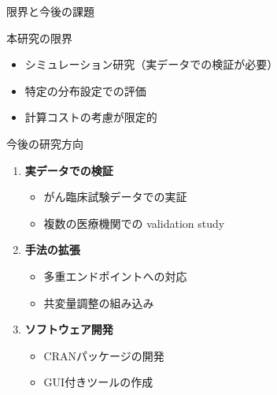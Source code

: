 \documentclass[11pt,aspectratio=169]{beamer}
\begin{document}
\begin{frame}{限界と今後の課題}
\begin{block}{本研究の限界}
\begin{itemize}
\item シミュレーション研究（実データでの検証が必要）
\item 特定の分布設定での評価
\item 計算コストの考慮が限定的
\end{itemize}
\end{block}

\vspace{1em}

\begin{block}{今後の研究方向}
\begin{enumerate}
\item \textbf{実データでの検証}
\begin{itemize}
\item がん臨床試験データでの実証
\item 複数の医療機関での validation study
\end{itemize}

\item \textbf{手法の拡張}
\begin{itemize}
\item 多重エンドポイントへの対応
\item 共変量調整の組み込み
\end{itemize}

\item \textbf{ソフトウェア開発}
\begin{itemize}
\item CRANパッケージの開発
\item GUI付きツールの作成
\end{itemize}
\end{enumerate}
\end{block}
\end{frame}
\end{document}

